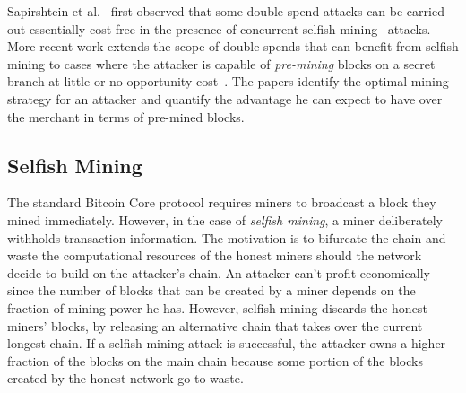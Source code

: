 Sapirshtein et al.~\cite{sapirshtein:2015} first observed that some double spend attacks can be carried out essentially cost-free in the presence of concurrent selfish mining~\cite{eyal:2014} attacks.
More recent work extends the scope of double spends that can benefit from selfish mining to cases where the attacker is capable of \emph{pre-mining} blocks on a secret branch at little or no opportunity cost~\cite{Sompolinsky:2016}. The papers identify the optimal mining strategy for an attacker and quantify the advantage he can expect to have over the merchant in terms of pre-mined blocks.


\subsection{Selfish Mining}

The standard Bitcoin Core protocol requires miners to broadcast a block they mined immediately. However, in the case of {\em selfish mining}, a miner deliberately withholds transaction information. The motivation is to bifurcate the chain and waste the computational resources of the honest miners should the network decide to build on the attacker's chain. An attacker can't profit economically since the number of blocks that can be created by a miner depends on the fraction of mining power he has. However, selfish mining discards the honest miners' blocks, by releasing an alternative chain that takes over the current longest chain. If a selfish mining attack is successful, the attacker owns a higher fraction of the blocks on the main chain because some portion of the blocks created by the honest network go to waste.

